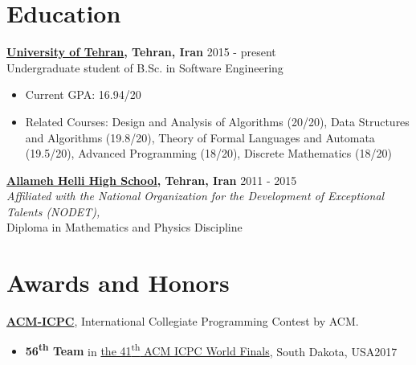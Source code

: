 \documentclass[margin]{res}
\begin{document}
 
 
 
\address{No. 14, Tanhajou Street, \\Tehranpars 3rd Square, \\Tehran, Iran, 1653984753}
\address{Cell: +98-919-6421171 \\ \href{mailto:shayan.hosseini@ut.ac.ir}{\texttt{shayan.hosseini@ut.ac.ir}} \\ 
		\href{http://www.shayanh.ir}{\texttt{http://www.shayanh.ir}}}

 
\begin{resume}

\section{Education}
    {\bf \href{http://ut.ac.ir/en}{University of Tehran}, Tehran, Iran} \hfill 2015 - present
    \\Undergraduate student of B.Sc. in Software Engineering
    
   	\begin{itemize}
	\item Current GPA: 16.94/20
	\item Related Courses: Design and Analysis of Algorithms (20/20), Data Structures and Algorithms (19.8/20),
	Theory of Formal Languages and Automata (19.5/20), Advanced Programming (18/20), Discrete Mathematics (18/20)
	\end{itemize}

    {\bf \href{http://www.helli.ir/}{Allameh Helli High School}, Tehran, Iran} \hfill 2011 - 2015
    \\\textit{\scriptsize Affiliated with the National Organization for the Development of Exceptional Talents (NODET),}
    \\Diploma in Mathematics and Physics Discipline

\section{Awards and Honors}
	{\bf \href{http://icpc.baylor.edu/}{ACM-ICPC}}, International Collegiate Programming Contest by ACM.
	\vspace{2mm}
	\begin{itemize}

	\item {\bf 56\textsuperscript{th} Team} in 
	\href{https://icpc.baylor.edu/community/results-2017}{the 41\textsuperscript{th} ACM ICPC World Finals}, 
	South Dakota, USA\hfill 2017


\end{itemize}
\end{resume}
\end{document}
